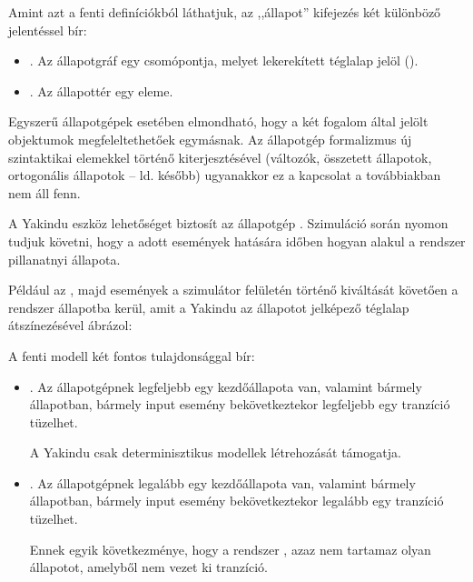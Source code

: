 Amint azt a fenti definíciókból láthatjuk, az ,,állapot'' kifejezés két különböző jelentéssel bír:

\begin{itemize}
	\item {}. Az állapotgráf egy csomópontja, melyet lekerekített téglalap jelöl ().
	\item {}. Az állapottér egy eleme.
\end{itemize}

Egyszerű állapotgépek esetében elmondható, hogy a két fogalom által jelölt objektumok megfeleltethetőek egymásnak. Az állapotgép formalizmus új szintaktikai elemekkel történő kiterjesztésével (változók, összetett állapotok, ortogonális állapotok -- ld. később) ugyanakkor ez a kapcsolat a továbbiakban nem áll fenn.

\begin{tipp}
A Yakindu eszköz lehetőséget biztosít az állapotgép . Szimuláció során nyomon tudjuk követni, hogy a adott események hatására időben hogyan alakul a rendszer pillanatnyi állapota.

Például az , majd  események a szimulátor felületén történő kiváltását követően a rendszer  állapotba kerül, amit a Yakindu az állapotot jelképező téglalap átszínezésével ábrázol:

\end{tipp}

A fenti modell két fontos tulajdonsággal bír:

\begin{itemize}
	\item {}. Az állapotgépnek legfeljebb egy kezdőállapota van, valamint bármely állapotban, bármely input esemény bekövetkeztekor legfeljebb egy tranzíció tüzelhet.

	\begin{megjegyzes}
		A Yakindu csak determinisztikus modellek létrehozását támogatja.
	\end{megjegyzes}

	\item {}. Az állapotgépnek legalább egy kezdőállapota van, valamint bármely állapotban, bármely input esemény bekövetkeztekor legalább egy tranzíció tüzelhet.

	\begin{megjegyzes}
		Ennek egyik következménye, hogy a rendszer , azaz nem tartamaz olyan állapotot, amelyből nem vezet ki tranzíció.
	\end{megjegyzes}
	
\end{itemize}

